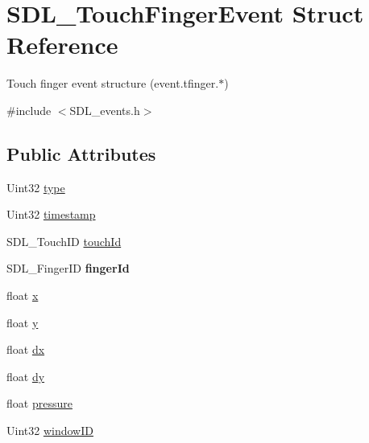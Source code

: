 \hypertarget{struct_s_d_l___touch_finger_event}{}\section{S\+D\+L\+\_\+\+Touch\+Finger\+Event Struct Reference}
\label{struct_s_d_l___touch_finger_event}


Touch finger event structure (event.\+tfinger.$\ast$)  




{\ttfamily \#include $<$S\+D\+L\+\_\+events.\+h$>$}

\subsection*{Public Attributes}
\begin{DoxyCompactItemize}
\item 
Uint32 \mbox{\hyperlink{struct_s_d_l___touch_finger_event_a3883218fa3426065ca66086c100edbfa}{type}}
\item 
Uint32 \mbox{\hyperlink{struct_s_d_l___touch_finger_event_abde2ab5cb013bbd21e37a65e2f8fa666}{timestamp}}
\item 
S\+D\+L\+\_\+\+Touch\+ID \mbox{\hyperlink{struct_s_d_l___touch_finger_event_ad7a6f39ec9af1bf47b160d18314edd70}{touch\+Id}}
\item 
\mbox{\label{struct_s_d_l___touch_finger_event_a8616d46ed19906e3ee90a4d481d3a284}} 
S\+D\+L\+\_\+\+Finger\+ID {\bfseries finger\+Id}
\item 
float \mbox{\hyperlink{struct_s_d_l___touch_finger_event_a0ce44b1342220fa17e9b9b4a77c2c906}{x}}
\item 
float \mbox{\hyperlink{struct_s_d_l___touch_finger_event_ac2bb8af638d2927a8e13f6ffe8f9384e}{y}}
\item 
float \mbox{\hyperlink{struct_s_d_l___touch_finger_event_ac6acac209d6e2bd659fdb6760081393d}{dx}}
\item 
float \mbox{\hyperlink{struct_s_d_l___touch_finger_event_a9c0320c5f18a6b9d10da657e166608c9}{dy}}
\item 
float \mbox{\hyperlink{struct_s_d_l___touch_finger_event_ab4fca822d0807b5748dbae8d3cc56524}{pressure}}
\item 
Uint32 \mbox{\hyperlink{struct_s_d_l___touch_finger_event_a3dd6c668612f197dcb1e2b69d8c5e0e7}{window\+ID}}
\end{DoxyCompactItemize}


